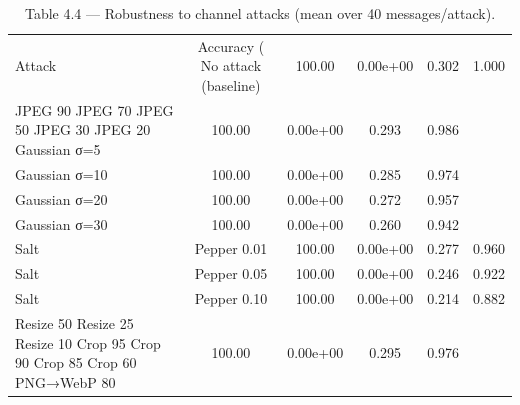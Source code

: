 \begin{table}[htbp]
\centering
\caption{Table 4.4 — Robustness to channel attacks (mean over 40 messages/attack).}
\label{tab:table_4_4_robustness}
\begin{tabular}{lcccc}
\hline
Attack & Accuracy (%
\hline
No attack (baseline) & 100.00 & 0.00e+00 & 0.302 & 1.000 \\
JPEG 90%
JPEG 70%
JPEG 50%
JPEG 30%
JPEG 20%
Gaussian σ=5 & 100.00 & 0.00e+00 & 0.293 & 0.986 \\
Gaussian σ=10 & 100.00 & 0.00e+00 & 0.285 & 0.974 \\
Gaussian σ=20 & 100.00 & 0.00e+00 & 0.272 & 0.957 \\
Gaussian σ=30 & 100.00 & 0.00e+00 & 0.260 & 0.942 \\
Salt & Pepper 0.01 & 100.00 & 0.00e+00 & 0.277 & 0.960 \\
Salt & Pepper 0.05 & 100.00 & 0.00e+00 & 0.246 & 0.922 \\
Salt & Pepper 0.10 & 100.00 & 0.00e+00 & 0.214 & 0.882 \\
Resize 50%
Resize 25%
Resize 10%
Crop 95%
Crop 90%
Crop 85%
Crop 60%
PNG→WebP 80 & 100.00 & 0.00e+00 & 0.295 & 0.976 \\
\hline
\end{tabular}
\end{table}
